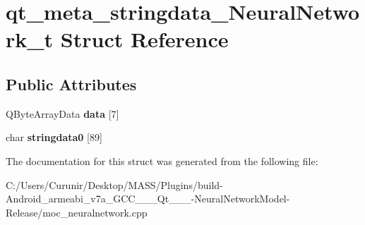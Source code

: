 \hypertarget{structqt__meta__stringdata___neural_network__t}{}\section{qt\+\_\+meta\+\_\+stringdata\+\_\+\+Neural\+Network\+\_\+t Struct Reference}
\label{structqt__meta__stringdata___neural_network__t}
\subsection*{Public Attributes}
\begin{DoxyCompactItemize}
\item 
\mbox{\label{structqt__meta__stringdata___neural_network__t_abbc63ad90d45d64610483d9166ff659e}} 
Q\+Byte\+Array\+Data {\bfseries data} \mbox{[}7\mbox{]}
\item 
\mbox{\label{structqt__meta__stringdata___neural_network__t_aee7a059fe972762e4349588c770f3faa}} 
char {\bfseries stringdata0} \mbox{[}89\mbox{]}
\end{DoxyCompactItemize}


The documentation for this struct was generated from the following file\+:\begin{DoxyCompactItemize}
\item 
C\+:/\+Users/\+Curunir/\+Desktop/\+M\+A\+S\+S/\+Plugins/build-\/\+Android\+\_\+armeabi\+\_\+v7a\+\_\+\+G\+C\+C\+\_\+\_\+\_\+\+Qt\+\_\+\_\+\_-\/\+Neural\+Network\+Model-\/\+Release/moc\+\_\+neuralnetwork.\+cpp\end{DoxyCompactItemize}
